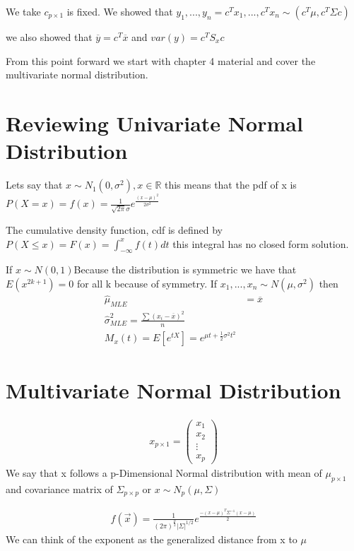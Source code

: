 We take $c_{p\times1}$ is fixed. We showed that $y_1,...,y_n = c^Tx_1,...,c^Tx_n \sim (c^T\mu,c^T\Sigma c)$

we also showed that $\overline{y} = c^T \overline{x}$ and $var(y) = c^TS_xc$

From this point forward we start with chapter 4 material and cover the multivariate normal distribution.

\section{Reviewing Univariate Normal Distribution}
Lets say that $x\sim N_1(0,\sigma^2),x\in \mathbb{R}$ this means that the pdf of x is $P(X=x)=f(x)= \frac{1}{\sqrt{2\pi}\sigma} e^{\frac{(x-\mu)^2}{2\sigma^2}}$

The cumulative density function, cdf is defined by $P(X\leq x) =F(x) = \displaystyle\int_{-\infty}^xf(t)dt$ this integral has no closed form solution.

If $x\sim N(0,1)$Because the distribution is symmetric we have that $E(x^{2k+1}) = 0$ for all k because of symmetry. 
If $x_1,...,x_n \sim N(\mu,\sigma^2)$ then
\begin{align*}
    \hat\mu_{MLE} &=\overline{x} \\
    \hat\sigma^2_{MLE} = \frac{\sum (x_i-\overline{x})^2}{n}\\
    M_x(t)=E[e^{tX}] = e^{\mu t +\frac{1}{2} \sigma^2 t^2}
\end{align*}

\section{Multivariate Normal Distribution}
\begin{align*}
    x_{p\times1}=\begin{pmatrix}
    x_1 \\
    x_2 \\
    \vdots \\
    x_p
    \end{pmatrix}
\end{align*}
We say that x follows a p-Dimensional Normal distribution with mean of $\mu_{p \times 1}$ and covariance matrix of $\Sigma_{p \times p}$ or $x \sim N_p(\mu,\Sigma)$

\begin{align*}
    f(\Vec{x})= \frac{1}{(2\pi)^{\frac{p}{2}}|\Sigma|^{1/2}}e^\frac{{-(x-\mu)^T\Sigma^{-1}(x-\mu)}}{2}
\end{align*}
We can think of the exponent as the generalized distance from x to $\mu$
